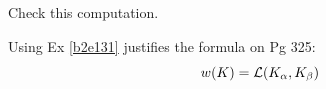 \documentclass[10pt]{article}
\begin{document}
\begin{example}
	Check this computation.
\end{example}
\sol Using Ex \ref{b2e131} justifies the formula on Pg 325:
$$
w(K)={\mathcal{L}}(K_\alpha,K_\beta)
$$
\end{document}
